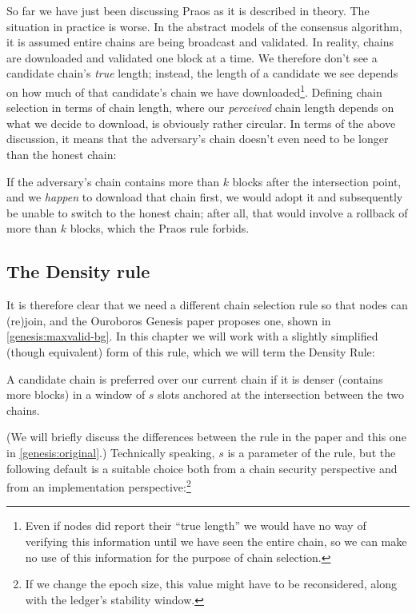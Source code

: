 So far we have just been discussing Praos as it is described in theory. The
situation in practice is worse. In the abstract models of the consensus
algorithm, it is assumed entire chains are being broadcast and validated. In
reality, chains are downloaded and validated one block at a time.
We therefore don't see a candidate chain's \emph{true} length; instead, the
length of a candidate we see depends on how much of that candidate's chain we
have downloaded\footnote{Even if nodes did report their ``true length'' we would
have no way of verifying this information until we have seen the entire chain,
so we can make no use of this information for the purpose of chain selection.}.
Defining chain selection in terms of chain length, where our \emph{perceived}
chain length depends on what we decide to download, is obviously rather
circular. In terms of the above discussion, it means that the adversary's chain
doesn't even need to be longer than the honest chain:
%
\begin{center}
\end{center}
%
If the adversary's chain contains more than $k$ blocks after the intersection
point, and we \emph{happen} to download that chain first, we would adopt it and
subsequently be unable to switch to the honest chain; after all, that would
involve a rollback of more than $k$ blocks, which the Praos rule forbids.

\clearpage

\subsection{The Density rule}
\label{genesis:background:density-rule}

It is therefore clear that we need a different chain selection rule so that
nodes can (re)join, and the Ouroboros Genesis paper \cite{cryptoeprint:2018:378}
proposes one, shown in \cref{genesis:maxvalid-bg}. In this chapter we will work
with a slightly simplified (though equivalent) form of this rule, which we will
term the Density Rule:
%
\begin{definition}
A candidate chain is preferred over our current chain if it is denser
(contains more blocks) in a window of $s$ slots anchored at the intersection
between the two chains.
\end{definition}
%
(We will briefly discuss the differences between the rule in the paper and this
one in \cref{genesis:original}.) Technically speaking, $s$ is a
parameter of the rule, but the following default is a suitable choice both from
a chain security perspective and from an implementation perspective:\footnote{If
we change the epoch size, this value might have to be reconsidered, along with
the ledger's stability window.}

